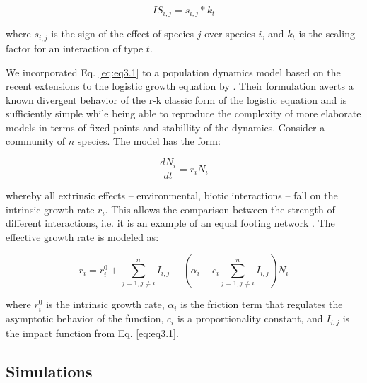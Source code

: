 \begin{equation} \label{eq:eq3.3}
IS_{i,j} = s_{i,j} * k_t
\end{equation}

where $s_{i,j}$ is the sign of the effect of species $j$ over species $i$, and $k_t$ is the scaling factor for an interaction of type $t$.

We incorporated Eq. \ref{eq:eq3.1} to a population dynamics model based on the recent extensions to the logistic growth equation by \cite{Garcia-Algarra2014}. Their formulation averts a known divergent behavior of the r-k classic form of the logistic equation and is sufficiently simple while being able to reproduce the complexity of more elaborate models in terms of fixed points and stabillity of the dynamics. Consider a community of $n$ species. The model has the form:

\begin{equation} \label{eq:eq3.4}
\frac{dN_i}{dt} = r_i N_i
\end{equation}

whereby all extrinsic effects – environmental, biotic interactions – fall on the intrinsic growth rate $r_i$. This allows the comparison between the strength of different interactions, i.e. it is an example of an equal footing network \citep{Garcia-Callejas2018}. The effective growth rate is modeled as:

\begin{equation} \label{eq:eq3.5}
r_i=r_i^0+\sum_{j=1,j{\neq}i}^n I_{i,j} - (\alpha_i + c_i \sum_{j=1,j{\neq}i}^{n} I_{i,j})N_i
\end{equation}

where $r_{i}^{0}$ is the intrinsic growth rate, $\alpha_i$ is the friction term that regulates the asymptotic behavior of the function, $c_i$ is a proportionality constant, and $I_{i,j}$ is the impact function from Eq. \ref{eq:eq3.1}.

\subsection*{Simulations}

